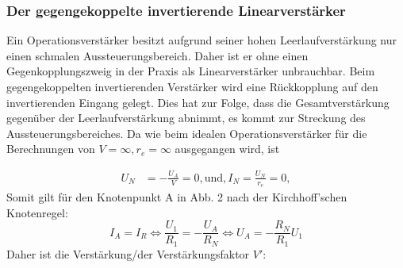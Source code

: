 \documentclass{scrartcl}
\begin{document}
\subsubsection{Der gegengekoppelte invertierende Linearverstärker}
Ein Operationsverstärker besitzt aufgrund seiner hohen Leerlaufverstärkung  nur einen schmalen Aussteuerungsbereich. Daher ist er ohne einen Gegenkopplungszweig in der Praxis als Linearverstärker unbrauchbar. Beim gegengekoppelten invertierenden Verstärker wird eine Rückkopplung auf den invertierenden Eingang gelegt. Dies hat zur Folge, dass die Gesamtverstärkung gegenüber der Leerlaufverstärkung abnimmt, es kommt zur Streckung des Aussteuerungsbereiches.
Da wie beim idealen Operationsverstärker für die Berechnungen von $V = \infty, r_e=\infty$ ausgegangen wird, ist

  \begin{align*}
    U_N &= -\frac{U_A}{V} = 0,
    \text{und},
    I_N = \frac{U_N}{r_e} = 0,
  \end{align*}
 Somit gilt für den Knotenpunkt A in Abb. 2 nach der Kirchhoff'schen Knotenregel:
\begin{equation*}
  I_A=I_R \iff \frac{U_1}{R_1}=-\frac{U_A}{R_N} \iff U_A=-\frac{R_N}{R_1}U_1
\end{equation*}
Daher ist die Verstärkung/der Verstärkungsfaktor $V'$:
\begin{equation}
\end{equation}

%
\end{document}
